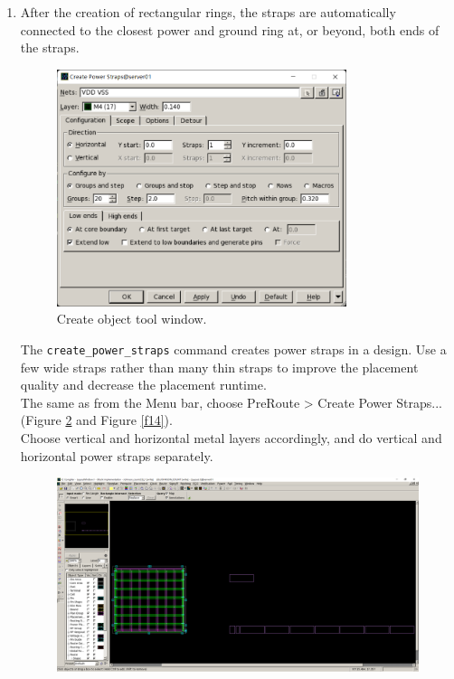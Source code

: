 \documentclass[a4paper,12pt,twoside]{article}
\begin{document}
\begin{enumerate}
\begin{enumerate}
\begin{figure}[H]
            \label{f12}
        \end{figure}
        \item After the creation of rectangular rings, the straps are automatically connected to the closest power and ground ring at, or beyond, both ends of the straps.
        \begin{figure}[H]
            \centering
            \includegraphics[width=0.8\textwidth]{images/13.png}
            \caption{Create object tool window.}
            \label{f13}
        \end{figure}
        The \texttt{create\_power\_straps} command creates power straps in a design. Use a few wide straps rather than many thin straps to improve the placement quality and decrease the placement runtime.\\
        The same as from the Menu bar, choose PreRoute > Create Power Straps... (Figure \ref{f13} and Figure \ref{f14}).\\
        Choose vertical and horizontal metal layers accordingly, and do vertical and horizontal power straps separately.
        \begin{figure}[H]
            \centering
            \includegraphics[width=\textwidth]{images/14.png}

\end{figure}
\end{enumerate}
\end{enumerate}
\end{document}
